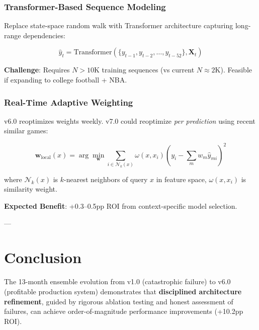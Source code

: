 \subsubsection{Transformer-Based Sequence Modeling}

Replace state-space random walk with Transformer architecture capturing long-range dependencies:

\begin{equation}
\hat{y}_{t} = \text{Transformer}(\{y_{t-1}, y_{t-2}, \ldots, y_{t-52}\}, \mathbf{X}_t)
\label{eq:transformer-predictor}
\end{equation}

\textbf{Challenge}: Requires $N > 10\text{K}$ training sequences (vs current $N \approx 2\text{K}$). Feasible if expanding to college football + NBA.

\subsubsection{Real-Time Adaptive Weighting}

v6.0 reoptimizes weights weekly. v7.0 could reoptimize \textit{per prediction} using recent similar games:

\begin{equation}
\mathbf{w}_{\text{local}}(x) = \arg\min_{\mathbf{w}} \sum_{i \in \mathcal{N}_k(x)} \omega(x, x_i) \left( y_i - \sum_m w_m \hat{y}_{mi} \right)^2
\label{eq:local-weighting}
\end{equation}

where $\mathcal{N}_k(x)$ is $k$-nearest neighbors of query $x$ in feature space, $\omega(x, x_i)$ is similarity weight.

\textbf{Expected Benefit}: +0.3--0.5pp ROI from context-specific model selection.

---

\section{Conclusion}

The 13-month ensemble evolution from v1.0 (catastrophic failure) to v6.0 (profitable production system) demonstrates that \textbf{disciplined architecture refinement}, guided by rigorous ablation testing and honest assessment of failures, can achieve order-of-magnitude performance improvements (+10.2pp ROI).

